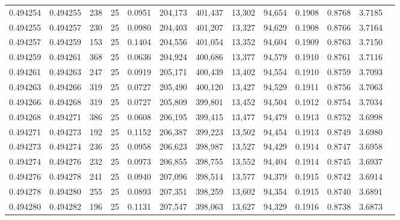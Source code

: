 \begin{tabular}{rrrrrrrrrrrrr}
0.494254 & 0.494255 &   238 &  25 &                                     0.0951 & 204,173 & 401,437 &  13,302 &  94,654 & 0.1908 & 0.8768 & 3.7185 \\
0.494255 & 0.494257 &   230 &  25 &                                     0.0980 & 204,403 & 401,207 &  13,327 &  94,629 & 0.1908 & 0.8766 & 3.7164 \\
0.494257 & 0.494259 &   153 &  25 &                                     0.1404 & 204,556 & 401,054 &  13,352 &  94,604 & 0.1909 & 0.8763 & 3.7150 \\
0.494259 & 0.494261 &   368 &  25 &                                     0.0636 & 204,924 & 400,686 &  13,377 &  94,579 & 0.1910 & 0.8761 & 3.7116 \\
0.494261 & 0.494263 &   247 &  25 &                                     0.0919 & 205,171 & 400,439 &  13,402 &  94,554 & 0.1910 & 0.8759 & 3.7093 \\
0.494263 & 0.494266 &   319 &  25 &                                     0.0727 & 205,490 & 400,120 &  13,427 &  94,529 & 0.1911 & 0.8756 & 3.7063 \\
0.494266 & 0.494268 &   319 &  25 &                                     0.0727 & 205,809 & 399,801 &  13,452 &  94,504 & 0.1912 & 0.8754 & 3.7034 \\
0.494268 & 0.494271 &   386 &  25 &                                     0.0608 & 206,195 & 399,415 &  13,477 &  94,479 & 0.1913 & 0.8752 & 3.6998 \\
0.494271 & 0.494273 &   192 &  25 &                                     0.1152 & 206,387 & 399,223 &  13,502 &  94,454 & 0.1913 & 0.8749 & 3.6980 \\
0.494273 & 0.494274 &   236 &  25 &                                     0.0958 & 206,623 & 398,987 &  13,527 &  94,429 & 0.1914 & 0.8747 & 3.6958 \\
0.494274 & 0.494276 &   232 &  25 &                                     0.0973 & 206,855 & 398,755 &  13,552 &  94,404 & 0.1914 & 0.8745 & 3.6937 \\
0.494276 & 0.494278 &   241 &  25 &                                     0.0940 & 207,096 & 398,514 &  13,577 &  94,379 & 0.1915 & 0.8742 & 3.6914 \\
0.494278 & 0.494280 &   255 &  25 &                                     0.0893 & 207,351 & 398,259 &  13,602 &  94,354 & 0.1915 & 0.8740 & 3.6891 \\
0.494280 & 0.494282 &   196 &  25 &                                     0.1131 & 207,547 & 398,063 &  13,627 &  94,329 & 0.1916 & 0.8738 & 3.6873 \\

\end{tabular}
